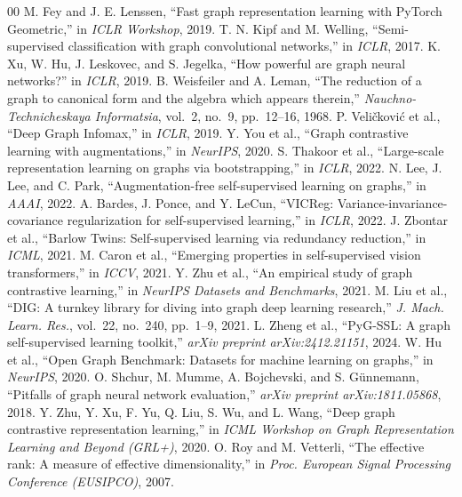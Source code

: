 \documentclass[conference]{IEEEtran}
\begin{document}
\begin{thebibliography}{00}
 M. Fey and J. E. Lenssen, ``Fast graph representation learning with PyTorch Geometric,'' in \textit{ICLR Workshop}, 2019.
 T. N. Kipf and M. Welling, ``Semi-supervised classification with graph convolutional networks,'' in \textit{ICLR}, 2017.
 K. Xu, W. Hu, J. Leskovec, and S. Jegelka, ``How powerful are graph neural networks?'' in \textit{ICLR}, 2019.
 B. Weisfeiler and A. Leman, ``The reduction of a graph to canonical form and the algebra which appears therein,'' \textit{Nauchno-Technicheskaya Informatsia}, vol.~2, no.~9, pp.~12--16, 1968.
 P. Veličković et al., ``Deep Graph Infomax,'' in \textit{ICLR}, 2019.
 Y. You et al., ``Graph contrastive learning with augmentations,'' in \textit{NeurIPS}, 2020.
 S. Thakoor et al., ``Large-scale representation learning on graphs via bootstrapping,'' in \textit{ICLR}, 2022.
 N. Lee, J. Lee, and C. Park, ``Augmentation-free self-supervised learning on graphs,'' in \textit{AAAI}, 2022.
 A. Bardes, J. Ponce, and Y. LeCun, ``VICReg: Variance-invariance-covariance regularization for self-supervised learning,'' in \textit{ICLR}, 2022.
 J. Zbontar et al., ``Barlow Twins: Self-supervised learning via redundancy reduction,'' in \textit{ICML}, 2021.
 M. Caron et al., ``Emerging properties in self-supervised vision transformers,'' in \textit{ICCV}, 2021.
 Y. Zhu et al., ``An empirical study of graph contrastive learning,'' in \textit{NeurIPS Datasets and Benchmarks}, 2021.
 M. Liu et al., ``DIG: A turnkey library for diving into graph deep learning research,'' \textit{J. Mach. Learn. Res.}, vol.~22, no.~240, pp.~1--9, 2021.
 L. Zheng et al., ``PyG-SSL: A graph self-supervised learning toolkit,'' \textit{arXiv preprint arXiv:2412.21151}, 2024.
 W. Hu et al., ``Open Graph Benchmark: Datasets for machine learning on graphs,'' in \textit{NeurIPS}, 2020.
 O. Shchur, M. Mumme, A. Bojchevski, and S. Günnemann, ``Pitfalls of graph neural network evaluation,'' \textit{arXiv preprint arXiv:1811.05868}, 2018.
 Y. Zhu, Y. Xu, F. Yu, Q. Liu, S. Wu, and L. Wang, ``Deep graph contrastive representation learning,'' in \textit{ICML Workshop on Graph Representation Learning and Beyond (GRL+)}, 2020.
 O. Roy and M. Vetterli, ``The effective rank: A measure of effective dimensionality,'' in \textit{Proc. European Signal Processing Conference (EUSIPCO)}, 2007.
\end{thebibliography}
\end{document}
